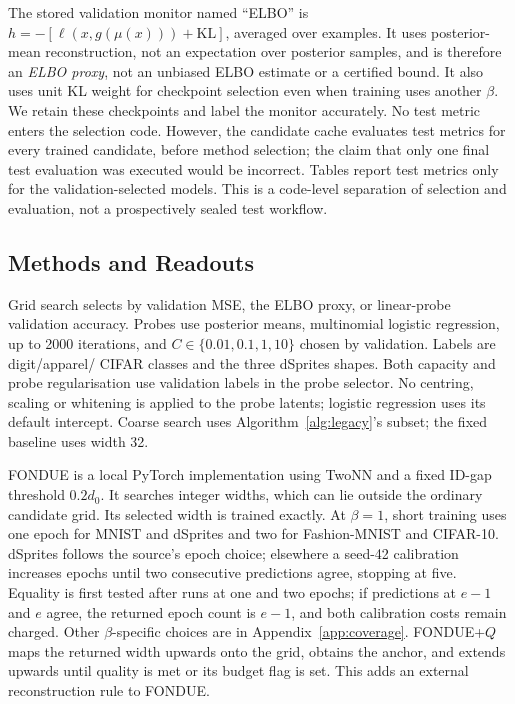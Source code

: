 \documentclass[make,article,submit,pdftex,moreauthors]{Definitions/mdpi}
\begin{document}
The stored validation monitor named ``ELBO'' is
$h=-[\ell(x,g(\mu(x)))+\mathrm{KL}]$, averaged over examples. It uses
posterior-mean reconstruction, not an expectation over posterior samples,
and is therefore an \emph{ELBO proxy}, not an unbiased ELBO estimate or a
certified bound. It also uses unit KL weight for checkpoint selection
even when training uses another $\beta$. We retain these checkpoints and
label the monitor accurately. No test metric enters the selection code.
However, the candidate cache evaluates test metrics for every trained
candidate, before method selection; the claim that only one final test
evaluation was executed would be incorrect. Tables report test metrics
only for the validation-selected models. This is a code-level separation
of selection and evaluation, not a prospectively sealed test workflow.

\subsection{Methods and Readouts}\label{sec:methods}
Grid search selects by validation MSE, the ELBO proxy, or linear-probe
validation accuracy. Probes use posterior means, multinomial logistic
regression, up to 2000 iterations, and
$C\in\{0.01,0.1,1,10\}$ chosen by validation. Labels are digit/apparel/
CIFAR classes and the three dSprites shapes. Both capacity and probe
regularisation use validation labels in the probe selector. No centring,
scaling or whitening is applied to the probe latents; logistic regression
uses its default intercept. Coarse search
uses Algorithm~\ref{alg:legacy}'s subset; the fixed baseline uses width 32.

FONDUE is a local PyTorch implementation using TwoNN and a fixed
ID-gap threshold $0.2d_0$. It searches integer widths, which can lie
outside the ordinary candidate grid. Its selected width is trained
exactly. At $\beta=1$, short training uses one epoch for MNIST and
dSprites and two for Fashion-MNIST and CIFAR-10. dSprites follows the
source's epoch choice; elsewhere a seed-42 calibration increases epochs
until two consecutive predictions agree, stopping at five. Equality is
first tested after runs at one and two epochs; if predictions at $e-1$
and $e$ agree, the returned epoch count is $e-1$, and both calibration
costs remain charged. Other
$\beta$-specific choices are in Appendix~\ref{app:coverage}.
FONDUE+$Q$ maps the returned width upwards onto the grid, obtains the
anchor, and extends upwards until quality is met or its budget flag is
set. This adds an external reconstruction rule to FONDUE.
\end{document}
